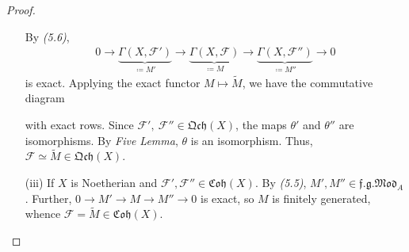 \documentclass[11pt,a4paper,footinclude=true,headinclude=true]{scrbook} %
\newcommand{\FF}{\mathscr{F}}
\newcommand{\<}{\langle}
\newcommand{\>}{\rangle}
\newcommand{\fg}{\mathfrak{f.g.}}
\newcommand{\MOD}{\mathfrak{Mod}}
\newcommand{\qcoh}{\mathfrak{Qch}}
\newcommand{\coh}{\mathfrak{Coh}}
\begin{document}
\begin{proof}
\begin{itemize}
        By \textit{(5.6)}, 
        \begin{align*}
            0\longrightarrow\underbrace{\Gamma(X,\FF')}_{\coloneqq M'}\longrightarrow\underbrace{\Gamma(X,\FF)}_{\coloneqq M}\longrightarrow\underbrace{\Gamma(X,\FF'')}_{\coloneqq M''}\longrightarrow0
        \end{align*}
        is exact. Applying the exact functor $M\mapsto\widetilde{M}$, we have the commutative diagram
        \begin{center}
        \end{center}
        with exact rows. Since $\FF',\ \FF''\in\qcoh(X)$, the maps $\theta'$ and $\theta''$ are isomorphisms. By \textit{Five Lemma}, $\theta$ is an isomorphism. Thus, $\FF\simeq\widetilde{M}\in\qcoh(X)$.
        \item[(iii)] If $X$ is Noetherian and $\FF',\FF''\in\coh(X)$. By \textit{(5.5)}, $M',M''\in\fg\MOD_A$. Further, $0\to M'\to M\to M''\to0$ is exact, so $M$ is finitely generated, whence $\FF=\widetilde{M}\in\coh(X)$.
    \end{itemize}
\end{proof}
\end{document}
